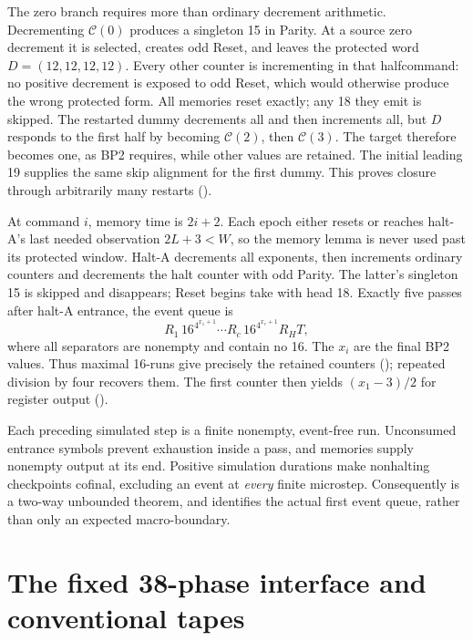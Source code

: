 The zero branch requires more than ordinary decrement arithmetic.
Decrementing $\mathcal C(0)$ produces a singleton 15 in Parity.  At a source
zero decrement it is selected, creates odd Reset, and leaves the protected
word $D=(12,12,12,12)$.  Every other counter is incrementing in that
halfcommand: no positive decrement is exposed to odd Reset, which would
otherwise produce the wrong protected form.  All memories reset exactly;
any 18 they emit is skipped.  The restarted dummy decrements all and then
increments all, but $D$ responds to the first half by becoming
$\mathcal C(2)$, then $\mathcal C(3)$.  The target therefore becomes one,
as BP2 requires, while other values are retained.  The initial leading 19
supplies the same skip alignment for the first dummy.  This proves closure
through arbitrarily many restarts
().

At command $i$, memory time is $2i+2$.  Each epoch either resets or reaches
halt-A's last needed observation $2L+3<W$, so the memory lemma is never used
past its protected window.  Halt-A decrements all exponents, then increments
ordinary counters and decrements the halt counter with odd Parity.  The latter's
singleton 15 is skipped and disappears; Reset begins take with head 18.
Exactly five passes after halt-A entrance, the event queue is
\[
 R_1\,16^{4^{x_1+1}}\cdots R_c\,16^{4^{x_c+1}}R_HT,
\]
where all separators are nonempty and contain no 16.  The $x_i$ are the final
BP2 values.  Thus maximal 16-runs give precisely the retained counters
(); repeated division by four
recovers them.  The first counter then yields $(x_1-3)/2$ for register output
().

Each preceding simulated step is a finite nonempty, event-free run.
Unconsumed entrance symbols prevent exhaustion inside a pass, and memories
supply nonempty output at its end.  Positive simulation durations make
nonhalting checkpoints cofinal, excluding an event at \emph{every} finite
microstep.  Consequently 
is a two-way unbounded theorem, and  identifies the
actual first event queue, rather than only an expected macro-boundary.

\section{The fixed 38-phase interface and conventional tapes}
\label{sec:source-cts}


